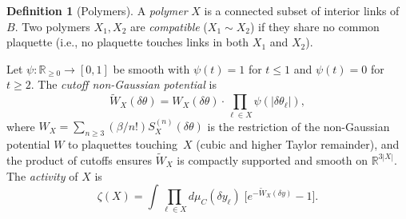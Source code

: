 \documentclass[11pt]{article}
\theoremstyle{definition}
\newtheorem{definition}[theorem]{Definition}
\newcommand{\R}{\mathbb{R}}
\begin{document}
\begin{definition}[Polymers]\label{def:polymer}
A \emph{polymer} $X$ is a connected subset of interior links of $B$.
Two polymers $X_1,X_2$ are \emph{compatible} ($X_1\sim X_2$) if they
share no common plaquette (i.e., no plaquette touches links in both
$X_1$ and $X_2$).

Let $\psi:\R_{\ge 0}\to[0,1]$ be smooth with $\psi(t)=1$ for $t\le 1$
and $\psi(t)=0$ for $t\ge 2$.  The \emph{cutoff non-Gaussian potential}
is
\begin{equation}
\widetilde{W}_X(\delta\theta)
=W_X(\delta\theta)\cdot\prod_{\ell\in X}\psi(|\delta\theta_\ell|),
\end{equation}
where $W_X=\sum_{n\ge 3}(\beta/n!)S_X^{(n)}(\delta\theta)$ is the
restriction of the non-Gaussian potential $W$ to plaquettes
touching~$X$ (cubic and higher Taylor remainder), and the product of
cutoffs ensures $\widetilde{W}_X$ is compactly supported and smooth
on $\R^{3|X|}$.  The \emph{activity} of $X$ is
\begin{equation}\label{eq:activity-def}
\zeta(X)=\int\prod_{\ell\in X}d\mu_C(\delta y_\ell)\;
\bigl[e^{-\widetilde{W}_X(\delta y)}-1\bigr].
\end{equation}
\end{definition}
\end{document}

